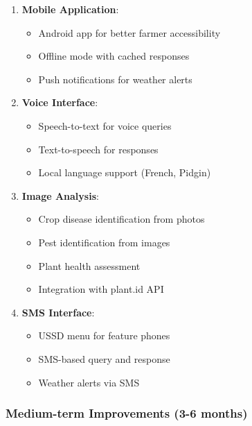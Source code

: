 \documentclass[12pt,a4paper]{article}
\begin{document}
\begin{enumerate}[leftmargin=*]
    \item \textbf{Mobile Application}:
    \begin{itemize}
        \item Android app for better farmer accessibility
        \item Offline mode with cached responses
        \item Push notifications for weather alerts
    \end{itemize}

    \item \textbf{Voice Interface}:
    \begin{itemize}
        \item Speech-to-text for voice queries
        \item Text-to-speech for responses
        \item Local language support (French, Pidgin)
    \end{itemize}

    \item \textbf{Image Analysis}:
    \begin{itemize}
        \item Crop disease identification from photos
        \item Pest identification from images
        \item Plant health assessment
        \item Integration with plant.id API
    \end{itemize}

    \item \textbf{SMS Interface}:
    \begin{itemize}
        \item USSD menu for feature phones
        \item SMS-based query and response
        \item Weather alerts via SMS
    \end{itemize}
\end{enumerate}

\subsubsection{Medium-term Improvements (3-6 months)}
\end{document}
